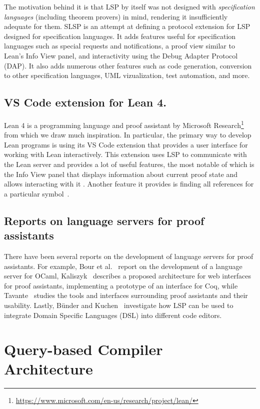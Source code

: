 The motivation behind it is that LSP by itself was not designed with \textit{specification languages}
(including theorem provers) in mind, rendering it insufficiently adequate for them.
SLSP is an attempt at defining a protocol extension for LSP designed for specification languages.
It adds features useful for specification languages such as special requests and notifications,
a proof view similar to Lean's Info View panel, and interactivity using the Debug Adapter Protocol (DAP).
It also adds numerous other features such as code generation, conversion to other specification languages,
UML vizualization, test automation, and more.

\subsection{VS Code extension for Lean 4.}

Lean 4 \cite{deMouraUllrich2021} is a programming language and proof assistant
by Microsoft Research\footnote{\url{https://www.microsoft.com/en-us/research/project/lean/}}
from which we draw much inspiration.
In particular, the primary way to develop Lean programs is using its VS Code
extension that provides a user interface for working with Lean interactively.
This extension uses LSP to communicate with the Lean server and provides a lot
of useful features, the most notable of which is the Info View panel that
displays information about current proof state and allows interacting with it \cite{Nawrocki2023}.
Another feature it provides is finding all references for a particular symbol~\cite{Mennicken2022}.

\subsection{Reports on language servers for proof assistants}

There have been several reports on the development of language servers for proof assistants.
For example, Bour et al.~\cite{Bour2018} report on the development of a language server for OCaml,
Kaliszyk~\cite{Kaliszyk2007} describes a proposed architecture for web interfaces for proof assistants,
implementing a prototype of an interface for Coq, while Tavante~\cite{Tavante2021} studies the
tools and interfaces surrounding proof assistants and their usability.
Lastly, Bünder and Kuchen~\cite{Buender2020} investigate how LSP can be used to integrate
Domain Specific Languages (DSL) into different code editors.

\section{Query-based Compiler Architecture}

